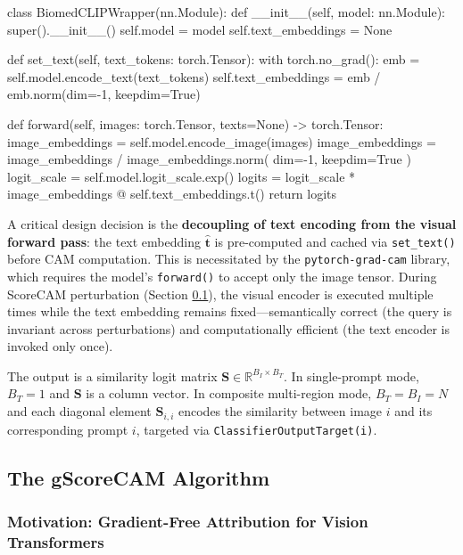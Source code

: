 \begin{pythoncode}[BiomedCLIPWrapper]
class BiomedCLIPWrapper(nn.Module):
    def __init__(self, model: nn.Module):
        super().__init__()
        self.model = model
        self.text_embeddings = None

    def set_text(self, text_tokens: torch.Tensor):
        with torch.no_grad():
            emb = self.model.encode_text(text_tokens)
            self.text_embeddings = emb / emb.norm(dim=-1, keepdim=True)

    def forward(self, images: torch.Tensor, texts=None) -> torch.Tensor:
        image_embeddings = self.model.encode_image(images)
        image_embeddings = image_embeddings / image_embeddings.norm(
            dim=-1, keepdim=True
        )
        logit_scale = self.model.logit_scale.exp()
        logits = logit_scale * image_embeddings @ self.text_embeddings.t()
        return logits
\end{pythoncode}

A critical design decision is the \textbf{decoupling of text encoding from the visual forward pass}: the text embedding $\hat{\mathbf{t}}$ is pre-computed and cached via \texttt{set\_text()} before CAM computation. This is necessitated by the \texttt{pytorch-grad-cam} library, which requires the model's \texttt{forward()} to accept only the image tensor. During ScoreCAM perturbation (Section \ref{sec:3_3_2}), the visual encoder is executed multiple times while the text embedding remains fixed---semantically correct (the query is invariant across perturbations) and computationally efficient (the text encoder is invoked only once).

The output is a similarity logit matrix $\mathbf{S} \in \mathbb{R}^{B_I \times B_T}$. In single-prompt mode, $B_T = 1$ and $\mathbf{S}$ is a column vector. In composite multi-region mode, $B_T = B_I = N$ and each diagonal element $\mathbf{S}_{i,i}$ encodes the similarity between image $i$ and its corresponding prompt $i$, targeted via \texttt{ClassifierOutputTarget(i)}.

\subsection{The gScoreCAM Algorithm}
\label{sec:3_3_2}

\subsubsection{Motivation: Gradient-Free Attribution for Vision Transformers}
\label{sec:3_3_2_1}

